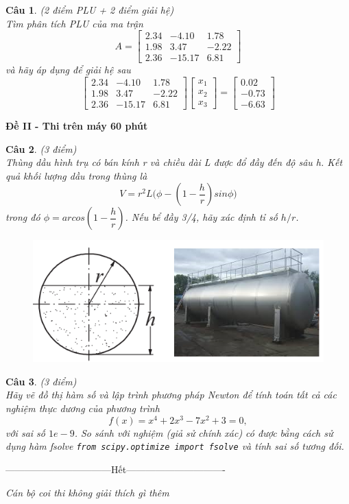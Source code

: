\documentclass[11pt]{article}
\newtheorem{bt}{Câu}
\newcommand{\m}[1]{
	\begin{bmatrix}
		#1
	\end{bmatrix}
}
\begin{document}
\begin{bt}(2 điểm PLU + 2 điểm giải hệ) \\
Tìm phân tích PLU của ma trận 
\[
A = \m{2.34 & -4.10 &  1.78 \\
	1.98  & 3.47 &  -2.22 \\
	2.36  & -15.17 &  6.81}
\]
và hãy áp dụng để giải hệ sau
%
\[
\m{2.34 & -4.10 &  1.78 \\
	1.98  & 3.47 &  -2.22 \\
	2.36  & -15.17 &  6.81} 
\m{x_1 \\ x_2 \\ x_3} = \m{0.02 \\ 	-0.73 \\ -6.63}
\]
%
\end{bt}
\cleardoublepage

\begin{center}	
	\textbf{ Đề II - Thi trên máy 60 phút}
\end{center}

\begin{bt}(3 điểm) \\ %
	Thùng dầu hình trụ có bán kính r và chiều dài L được đổ đầy đến độ sâu h. Kết quả
	khối lượng dầu trong thùng là
	\[
	V = r^2L \Big( \phi - \left(1 - \dfrac{h}{r}\right) sin \phi \Big)
	\]
	trong đó $\phi = arcos\left(1 - \dfrac{h}{r}\right)$. Nếu bể đầy 3/4, hãy xác định tỉ số $h/r$.
	
	\begin{figure}[h!]
		\centering
		\includegraphics[width=0.7\linewidth]{oil_tank}
		\caption{}
		\label{fig:oiltank}
	\end{figure}
\end{bt}

\begin{bt}(3 điểm) \\
Hãy vẽ đồ thị hàm số và lập trình phương pháp Newton để tính toán tất cả các nghiệm thực dương của phương trình
\[ 
f(x) = x^4 + 2x^3 - 7x^2 + 3 = 0,
\]
với sai số $1e-9$. So sánh với nghiệm (giả sử chính xác) có được bằng cách sử dụng hàm fsolve \verb|from scipy.optimize import fsolve| và tính sai số tương đối.
\end{bt}

\centerline{———————————Hết——————————-}

\vspace{1cm}
 {\it Cán bộ coi thi không giải thích gì thêm}\\

  
\end{document}
